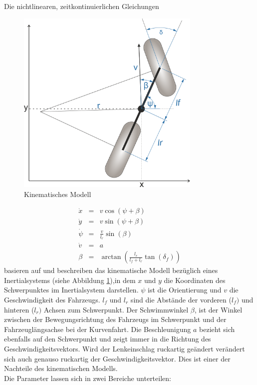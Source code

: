 \documentclass{like}
\begin{document}
Die nichtlinearen, zeitkontinuierlichen Gleichungen 

\begin{figure}[ht!]
	\centering
	\includegraphics[width=250pt]{Abbildungen/kinBicycle.png}
	\caption{Kinematisches Modell}
	\label{fig:kinmodel}
\end{figure}

\begin{eqnarray}
\label{eq:kinDiscrete}
\dot{x}   &= &v  \cos(\psi + \beta)\\
\dot{y}   &= &v  \sin(\psi + \beta)\\
\dot{\psi} &= &\frac{v}{l_r} \sin(\beta) \\
\dot{v}    &= &a \\
\beta      &= &\arctan \left( \frac{l_r}{l_f + l_r} \tan(\delta_f) \right) \label{compute_beta}
\end{eqnarray}
basieren auf \cite{rajamani2011vehicle, 7225830} und beschreiben das kinematische Modell bezüglich eines Inertialsystems (siehe Abbildung \ref{fig:kinmodel}),in dem \(x\) und \(y\) die Koordinaten des Schwerpunktes im Inertialsystem darstellen. 
\(\psi\) ist die Orientierung und \(v\) die Geschwindigkeit des Fahrzeugs. \(l_f\) und \(l_r\) sind die Abstände der vorderen (\(l_f)\) und hinteren (\(l_r)\) Achsen zum Schwerpunkt.
Der Schwimmwinkel \(\beta\), ist der Winkel  zwischen der Bewegungsrichtung des Fahrzeugs im Schwerpunkt und der Fahrzeuglängsachse bei der Kurvenfahrt. Die Beschleunigung \(a\) bezieht sich ebenfalls auf den Schwerpunkt und zeigt immer in die Richtung des Geschwindigkeitsvektors. Wird der Lenkeinschlag ruckartig geändert verändert sich auch genauso ruckartig der Geschwindigkeitsvektor. Dies ist einer der Nachteile des kinematischen Modells.\\
Die Parameter lassen sich in zwei Bereiche unterteilen:
\end{document}
